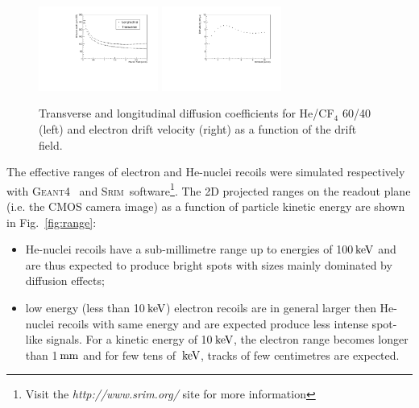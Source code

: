 \documentclass[physics,article,submit,moreauthors,pdftex]{Definitions/mdpi}
\newcommand{\GEANT} {{\textsc{Geant4}}\xspace}
\newcommand{\SRIM} {{\textsc{Srim}}\xspace}
\newcommand{\unit}[1]{\ensuremath{\textrm{\,#1}}\xspace}
\newcommand{\keV}{\ensuremath{\,\textrm{ke\hspace{-.08em}V}}\xspace}
\begin{document}
\begin{figure}[t!]
\centering
\includegraphics[width=0.35\textwidth]{diff6040_zoom.pdf}
\includegraphics[width=0.35\textwidth]{vdrift6040.pdf}
\caption{Transverse and longitudinal diffusion coefficients for He/CF$_{4}$ 60/40 (left) and electron drift velocity (right) as a function of the drift field.}
\label{fig:diff_vdrift}
\end{figure}


 
The effective ranges of electron and He-nuclei recoils were simulated
respectively with \GEANT~\cite{bib:geant} and
 \SRIM~software\footnote{Visit the {\it http://www.srim.org/} site for more information}. The 2D projected ranges on the readout plane (i.e. the CMOS camera image) as a function of particle kinetic energy are shown in Fig.~\ref{fig:range}:
 \begin{itemize}
     \item He-nuclei recoils have a sub-millimetre range up to energies
       of 100\keV and are thus expected to produce bright spots with
       sizes mainly dominated by diffusion effects;
     \item low energy (less than 10\keV) electron recoils are in
       general larger then He-nuclei recoils with same energy and are
       expected produce less intense spot-like signals. For a kinetic
       energy of 10\keV, the electron range becomes longer than
       1\unit{mm} and for few tens of \keV, tracks of few centimetres
       are expected.
 \end{itemize}
\end{document}
